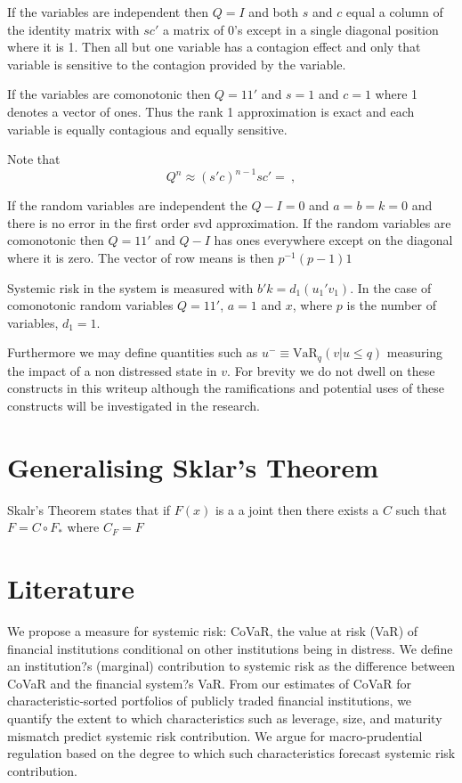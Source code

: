 \documentclass[authoryear]{elsarticle}
\newcommand{\var}{\ensuremath{\mathrm{VaR}}}
\begin{document}
If the variables are independent then $Q=I$ and both $s$ and $c$ equal a column of the identity matrix with $sc'$ a matrix of 0's except in a single diagonal position where it is 1.   Then all but one variable has a contagion effect and only that variable is sensitive to the contagion provided by the  variable.

If the variables are comonotonic then $Q=11'$ and $s=1$ and $c=1$ where 1 denotes a vector of ones.   Thus the rank 1 approximation is exact and each variable is equally contagious and equally sensitive.
 
 Note that 
 $$
 Q^{n} \approx (s'c)^{n-1}sc'=\ ,
 $$
 
 
 If the random variables are independent the $Q-I=0$ and $a=b=k=0$ and there is no error in the first order svd approximation.    If the random variables are comonotonic then $Q=11'$ and $Q-I$ has ones everywhere except on the diagonal where it is zero.   The vector of row means is then $p^{-1}(p-1)1$
 
Systemic risk in the system is measured with $b'k=d_1(u_1'v_1)$.   In the case of comonotonic  random variables $Q=11'$, $a=1$ and $x$, where $p$ is the number of variables,  $d_1=1$. 
 
Furthermore we may define quantities such as
$
u^- \equiv \var_q(v|u\le q)
$
measuring the impact of a non distressed state in $v$.  For brevity we do not dwell on these constructs in this writeup although the ramifications and potential uses of these constructs will be  investigated in the research.

\section{Generalising Sklar's Theorem}

Skalr's Theorem states that if $F(x)$ is a a joint then there exists a $C$ such that
$
F=C\circ F_*
$ where $C_F=F$
\section{Literature}

We propose a measure for systemic risk: CoVaR, the value at risk (VaR) of financial institutions conditional on other institutions being in distress. We define an institution?s (marginal) contribution to systemic risk as the difference between CoVaR and the financial system?s VaR. From our estimates of CoVaR for characteristic-sorted portfolios of publicly traded financial institutions, we quantify the extent to which characteristics such as leverage, size, and maturity mismatch predict systemic risk contribution. We argue for macro-prudential regulation based on the degree to which such characteristics forecast systemic risk contribution.
\end{document}
